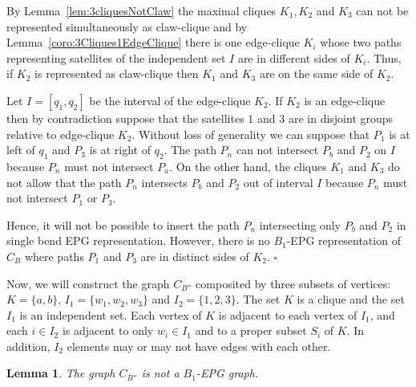 \documentclass[9pt]{entcs}
\newtheorem{lema}{Lemma}[section]
\begin{document}
\begin{pf}
By Lemma~\ref{lem:3cliquesNotClaw} the maximal cliques $K_1, K_2$ and $K_3$ can not be represented simultaneously as claw-clique and by Lemma~\ref{coro:3Cliques1EdgeClique} there is one edge-clique $K_i$ whose two paths representing satellites of the independent set $I$ are in different sides of  $K_i$. Thus, if $K_2$ is represented as claw-clique then $K_1$ and $K_3$ are on the same side of $K_2$.

Let $I=[q_1,q_2]$ be the interval of the edge-clique $K_2$.  If $K_2$ is an edge-clique then by contradiction suppose that the satellites $1$ and $3$ are in disjoint groups relative to edge-clique $K_2$. Without loss of generality we can suppose that $P_1$ is at left of $q_1$ and $P_3$ is at right of $q_2$. The path $P_n$ can not intersect $P_b$ and $P_2$ on $I$ because $P_n$ must not intersect $P_a$. On the other hand, the cliques $K_1$ and $K_3$ do not allow that the path $P_n$ intersects $P_b$ and $P_2$ out of interval $I$ because $P_n$ must not intersect $P_1$ or $P_3$.

 Hence, it will not be possible to insert the path $P_{n}$ intersecting only $P_{b}$ and $P_{2}$ in single bend EPG representation. However, there is no $B_1$-EPG representation of $C_{B}$ where paths $P_1$ and $P_3$ are in distinct sides of $K_2$. $\square$

 \end{pf} 

Now, we will construct the graph $C_{B''}$ composited by three subsets of vertices: $K=\{a,b\}$, $I_1=\{w_1,w_2,w_3\}$  and
$I_2=\{1,2,3\}$. The set $K$ is a clique and the set $I_1$ is an independent set. Each vertex of $K$ is adjacent to each vertex of $I_1$, and each  $i\in I_2$ is adjacent to only $w_i\in I_1$ and to a proper subset $S_i$ of $K$. In addition, $I_2$ elements may or may not have edges with each other.


\begin{lema}\label{lem:cb''}
The graph $C_{B''}$  is not a  $B_1$-EPG graph.
\end{lema}
\end{document}
